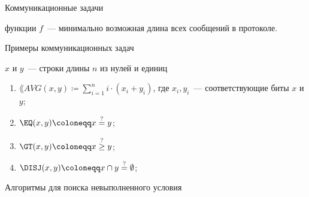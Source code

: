 \begin{frame}{Коммуникационные задачи}

    \begin{center}
    	    
    \end{center}

    \pause
    \pause
    \pause
	\pause

     функции $f$~--- минимально возможная длина всех сообщений в
    протоколе.
\end{frame}


\begin{frame}{Примеры коммуникационных задач}
    
    $x$ и $y$~--- строки длины $n$ из нулей и единиц
            
    \begin{overlayarea}{\textwidth}{10cm}
        \begin{enumerate}
            \item $\lang{AVG}(x, y) \coloneqq \sum\limits_{i = 1}^{n} i \cdot (x_i + y_i)$, где $x_i, y_i$~---
                соответствующие биты $x$ и $y$;

        \pause

        \pause
            \item $\EQ(x, y) \coloneqq x \stackrel{?}{=} y$;


        \pause
            \item $\GT(x, y) \coloneqq x \stackrel{?}{\ge} y$;
            \item $\DISJ(x, y) \coloneqq x \cap y \stackrel{?}{=} \emptyset$;
        \end{enumerate}
    \end{overlayarea}
\end{frame}

\begin{frame}{Алгоритмы для поиска невыполненного условия}
    
\end{frame}